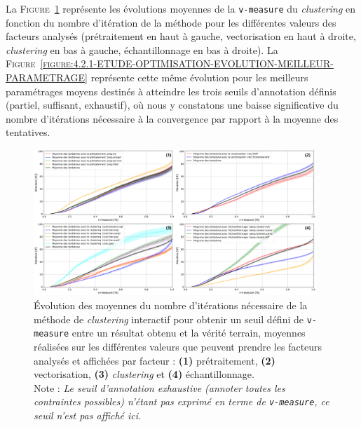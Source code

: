 		
			La \textsc{Figure~\ref{figure:4.2.1-ETUDE-OPTIMISATION-EVOLUTION-PAR-FACTEURS}} représente les évolutions moyennes de la \texttt{v-measure} du \textit{clustering} en fonction du nombre d'itération de la méthode pour les différentes valeurs des facteurs analysés (prétraitement en haut à gauche, vectorisation en haut à droite, \textit{clustering} en bas à gauche, échantillonnage en bas à droite).
			La \textsc{Figure~\ref{figure:4.2.1-ETUDE-OPTIMISATION-EVOLUTION-MEILLEUR-PARAMETRAGE}} représente cette même évolution pour les meilleurs paramétrages moyens destinés à atteindre les trois seuils d'annotation définis (partiel, suffisant, exhaustif), où nous y constatons une baisse significative du nombre d'itérations nécessaire à la convergence par rapport à la moyenne des tentatives.
			\begin{figure}[!htb]
				\centering
				\includegraphics[width=0.95\textwidth]{figures/etude-efficience-evolution-moyenne-par-vmeasure-par-facteur}
				\caption{Évolution des moyennes du nombre d'itérations nécessaire de la méthode de \textit{clustering} interactif pour obtenir un seuil défini de \texttt{v-measure} entre un résultat obtenu et la vérité terrain, moyennes réalisées sur les différentes valeurs que peuvent prendre les facteurs analysés et affichées par facteur : \textbf{(1)} prétraitement, \textbf{(2)} vectorisation, \textbf{(3)} \textit{clustering} et \textbf{(4)} échantillonnage. \\
				Note : \textit{Le seuil d'annotation exhaustive (annoter toutes les contraintes possibles) n'étant pas exprimé en terme de \texttt{v-measure}, ce seuil n'est pas affiché ici.}}
				\label{figure:4.2.1-ETUDE-OPTIMISATION-EVOLUTION-PAR-FACTEURS}
			\end{figure}
